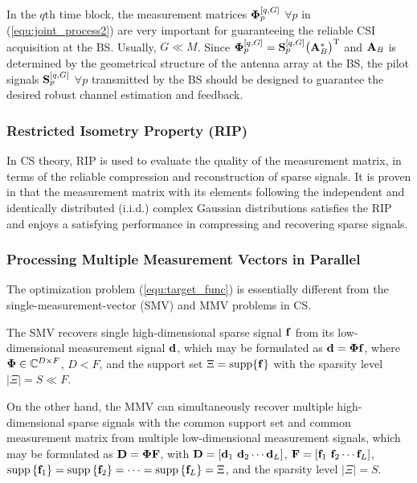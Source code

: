 \documentclass[final]{IEEEtran}
\begin{document}
 In the $q$th time block, the measurement matrices ${\bf{\Phi}}_p^{[q,G]}$ $\forall p$ in
 (\ref{equ:joint_process2}) are very important for guaranteeing the reliable CSI acquisition
 at the BS. Usually, $G \ll M$. Since ${\bf{\Phi}}_p^{[q,G]}={\bf S}_p^{[q,G]}\big(
 {\bf A}_B^{*}\big)^{\rm T}$ and ${\bf A}_B$ is determined by the geometrical structure of
 the antenna array at the BS, the pilot signals ${\bf S}_p^{[q,G]}$ $\forall p$ transmitted
 by the BS should be designed to guarantee the desired robust channel estimation and feedback.

\subsubsection{Restricted Isometry Property (RIP)}

 In CS theory, RIP is used to evaluate the quality of the measurement matrix, in terms of
 the reliable compression and reconstruction of sparse signals. It is proven in \cite{STR_CS}
 that the measurement matrix with its elements following the independent and identically
 distributed (i.i.d.) complex Gaussian distributions satisfies the RIP and enjoys a satisfying
 performance in compressing and recovering sparse signals.

\subsubsection{Processing Multiple Measurement Vectors in Parallel}

 The optimization problem (\ref{equ:target_func}) is essentially different from the
 single-measurement-vector (SMV) and MMV problems in CS.

 The SMV recovers single high-dimensional sparse signal ${\bf f}$ from its low-dimensional
 measurement signal ${\bf d}$, which may be formulated as ${\bf d}={\bf{\Phi}}{\bf f}$, where
 ${\bf{\Phi}}\in \mathbb{C}^{D\times F}$, $D < F$, and the support set $\Xi={\rm{supp}}\{{\bf f}\}$
 with the sparsity level $|\Xi|=S \ll F$.

 On the other hand, the MMV can simultaneously recover multiple high-dimensional sparse
 signals with the common support set and common measurement matrix from multiple
 low-dimensional measurement signals, which may be formulated as ${\bf D} ={\bf{\Phi}}{\bf F}$,
 with ${\bf D}=\left[ {\bf d}_1 ~ {\bf d}_2 \cdots {\bf d}_L\right]$, ${\bf F}=\left[
 {\bf f}_1 ~ {\bf f}_2 \cdots {\bf f}_L\right]$, ${\rm{supp}}\left\{ {\bf f}_1\right\}
 ={\rm{supp}}\left\{ {\bf f}_2\right\}=\cdots ={\rm{supp}}\left\{ {\bf f}_L\right\}=\Xi$, and
 the sparsity level  $\left| \Xi \right| =S$.
\end{document}
